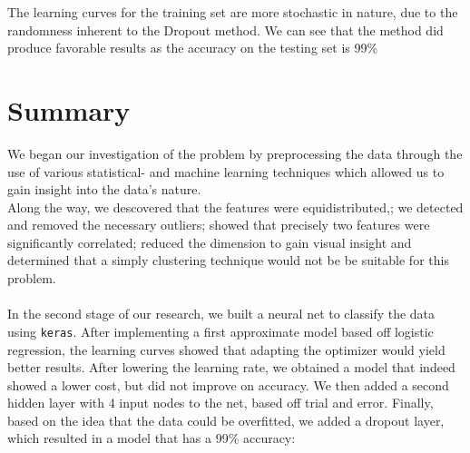 \documentclass[14pt]{article}
\theoremstyle{plain}
\theoremstyle{definition}
\begin{document}
\noindent The learning curves for the training set are more stochastic in  nature, due to the randomness inherent to the Dropout method. We can see that the method did produce favorable results as the accuracy on the testing set is 99\%

\section{Summary}

We began our investigation of the problem by preprocessing the data through the use of various statistical- and machine learning techniques which allowed us to gain insight into the data's nature.\\ Along the way, we descovered that the features were equidistributed,; we detected and removed the necessary outliers; showed that precisely two features were significantly correlated; reduced the dimension to gain visual insight and determined that a simply clustering technique would not be be suitable for this problem.\\\\ 
In the second stage of our research, we built a neural net to classify the data using \texttt{keras}. After implementing a first approximate model based off logistic regression, the learning curves showed that adapting the optimizer would yield better results. After lowering the learning rate, we obtained a model that indeed showed a lower cost, but did not improve on accuracy. We then added a second hidden layer with 4 input nodes to the net, based off trial and error. Finally, based on the idea that the data could be overfitted, we added a dropout layer, which resulted in a model that has a 99\% accuracy:

\begin{center}
\end{center}
\end{document}
